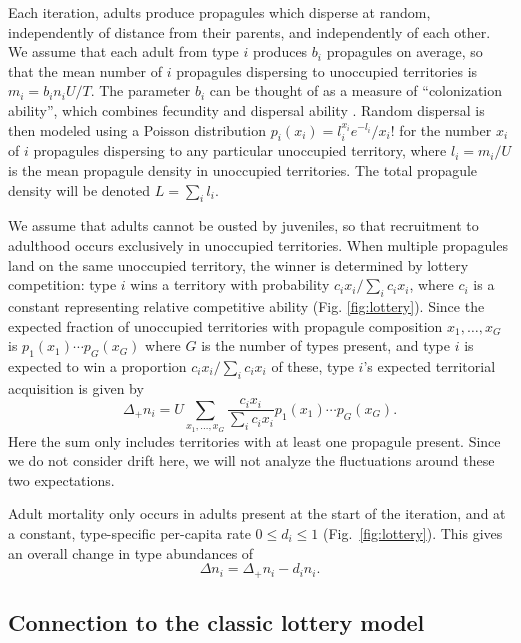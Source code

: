 \documentclass[12pt]{article}
\begin{document}
Each iteration, adults produce propagules which disperse at random, independently of distance from their parents, and independently of each other. We assume that each adult from type $i$ produces $b_i$ propagules on average, so that the mean number of $i$ propagules dispersing to unoccupied territories is $m_i=b_in_iU/T$. The parameter $b_i$ can be thought of as a measure of ``colonization ability'', which combines fecundity and dispersal ability \citep{levins_71,tilman_94}. Random dispersal is then modeled using a Poisson distribution $p_i(x_i)=l_i^{x_i} e^{-l_i}/x_i!$ for the number $x_i$ of $i$ propagules dispersing to any particular unoccupied territory, where $l_i=m_i/U$ is the mean propagule density in unoccupied territories. The total propagule density will be denoted $L=\sum_i l_i$.

We assume that adults cannot be ousted by juveniles, so that recruitment to adulthood occurs exclusively in unoccupied territories. When multiple propagules land on the same unoccupied territory, the winner is determined by lottery competition: type $i$ wins a territory with probability $c_i x_i/\sum_i c_i x_i$, where $c_i$ is a constant representing relative competitive ability (Fig. \ref{fig:lottery}). Since the expected fraction of unoccupied territories with propagule composition $x_1,\ldots,x_G$ is $p_1(x_1)\cdots p_G(x_G)$ where $G$ is the number of types present, and type $i$ is expected to win a proportion $c_i x_i/\sum_i c_i x_i$ of these, type $i$'s expected territorial acquisition is given by
\begin{equation}
\Delta_+ n_i=U\sum_{x_1,\ldots,x_G} \frac{c_i x_i}{\sum_i c_i x_i} p_1(x_1)\cdots p_G(x_G). \label{eq:growthsumuncoupled}
\end{equation}
Here the sum only includes territories with at least one propagule present. Since we do not consider drift here, we will not analyze the fluctuations around these two expectations.

Adult mortality only occurs in adults present at the start of the  iteration, and at a constant, type-specific per-capita rate $0\leq d_i\leq 1$ (Fig.~\ref{fig:lottery}). This gives an overall change in type abundances of
\begin{equation}
\Delta n_i=\Delta_+ n_i-d_i n_i. \label{eq:delttot}
\end{equation}

\subsection*{Connection to the classic lottery model}
\end{document}
